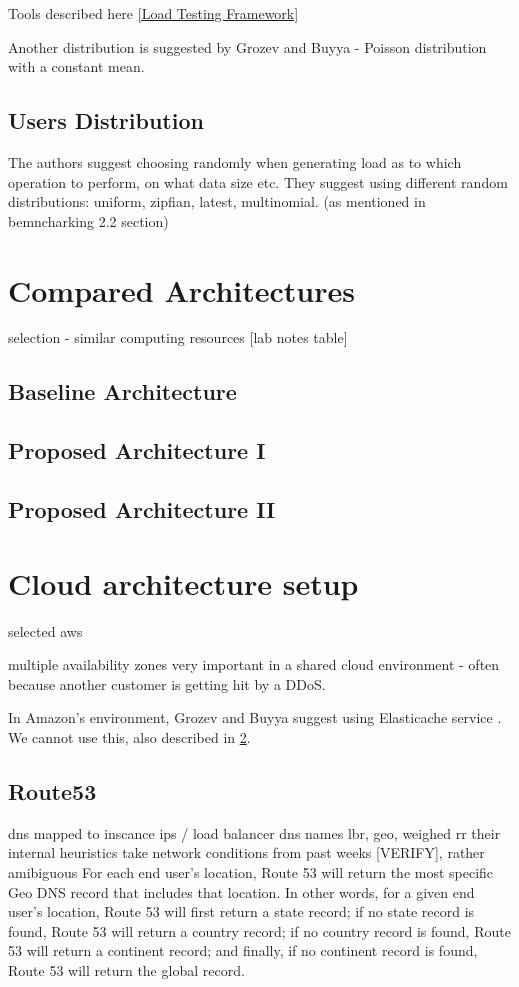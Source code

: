 \documentclass{uvamscse}
\begin{document}
Tools described here \ref{Load Testing Framework}

Another distribution is suggested by Grozev and Buyya \cite{GroBuy} - Poisson distribution with a constant mean.


\subsection{Users Distribution}
The authors suggest choosing randomly when generating load as to which operation to perform, on what data size etc. They suggest using different random distributions: uniform, zipfian, latest, multinomial\cite{Ycsb}. (as mentioned in bemncharking 2.2 section)

\section{Compared Architectures}

selection - similar computing resources [lab notes table]

\subsection{Baseline Architecture}

\subsection{Proposed Architecture I}

\subsection{Proposed Architecture II}

\section{Cloud architecture setup} \label{Cloud architecture setup}

selected aws

multiple availability zones very important in a shared cloud environment - often because another customer is getting hit by a DDoS.\cite{GroBuy}

In Amazon’s environment, Grozev and Buyya suggest using Elasticache service \cite{GroBuy}. We cannot use this, also described in \ref{Cloud architecture setup}.

\subsection{Route53}
  dns mapped to inscance ips / load balancer dns names
  lbr, geo, weighed rr
  their internal heuristics take network conditions from past weeks [VERIFY], rather amibiguous
  For each end user’s location, Route 53 will return the most specific Geo DNS record that includes that location. In other words, for a given end user’s location, Route 53 will first return a state record; if no state record is found, Route 53 will return a country record; if no country record is found, Route 53 will return a continent record; and finally, if no continent record is found, Route 53 will return the global record.
\end{document}
